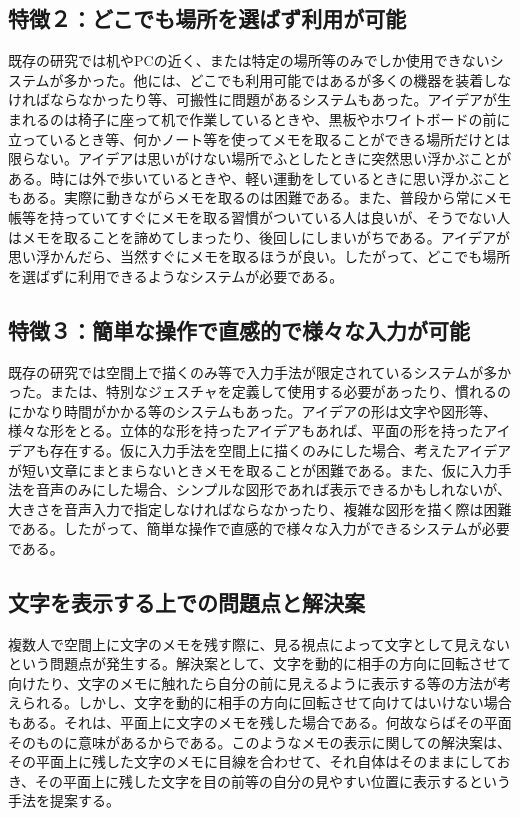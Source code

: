 \documentclass[technicalreport]{ieicej}
\begin{document}
\subsection*{特徴２：どこでも場所を選ばず利用が可能}
既存の研究では机やPCの近く、または特定の場所等のみでしか使用できないシステムが多かった。他には、どこでも利用可能ではあるが多くの機器を装着しなければならなかったり等、可搬性に問題があるシステムもあった。アイデアが生まれるのは椅子に座って机で作業しているときや、黒板やホワイトボードの前に立っているとき等、何かノート等を使ってメモを取ることができる場所だけとは限らない。アイデアは思いがけない場所でふとしたときに突然思い浮かぶことがある。時には外で歩いているときや、軽い運動をしているときに思い浮かぶこともある。実際に動きながらメモを取るのは困難である。また、普段から常にメモ帳等を持っていてすぐにメモを取る習慣がついている人は良いが、そうでない人はメモを取ることを諦めてしまったり、後回しにしまいがちである。アイデアが思い浮かんだら、当然すぐにメモを取るほうが良い。したがって、どこでも場所を選ばずに利用できるようなシステムが必要である。

\subsection*{特徴３：簡単な操作で直感的で様々な入力が可能}
既存の研究では空間上で描くのみ等で入力手法が限定されているシステムが多かった。または、特別なジェスチャを定義して使用する必要があったり、慣れるのにかなり時間がかかる等のシステムもあった。アイデアの形は文字や図形等、様々な形をとる。立体的な形を持ったアイデアもあれば、平面の形を持ったアイデアも存在する。仮に入力手法を空間上に描くのみにした場合、考えたアイデアが短い文章にまとまらないときメモを取ることが困難である。また、仮に入力手法を音声のみにした場合、シンプルな図形であれば表示できるかもしれないが、大きさを音声入力で指定しなければならなかったり、複雑な図形を描く際は困難である。したがって、簡単な操作で直感的で様々な入力ができるシステムが必要である。

\subsection{文字を表示する上での問題点と解決案} \label{moji_mondai}
複数人で空間上に文字のメモを残す際に、見る視点によって文字として見えないという問題点が発生する。解決案として、文字を動的に相手の方向に回転させて向けたり、文字のメモに触れたら自分の前に見えるように表示する等の方法が考えられる。しかし、文字を動的に相手の方向に回転させて向けてはいけない場合もある。それは、平面上に文字のメモを残した場合である。何故ならばその平面そのものに意味があるからである。このようなメモの表示に関しての解決案は、その平面上に残した文字のメモに目線を合わせて、それ自体はそのままにしておき、その平面上に残した文字を目の前等の自分の見やすい位置に表示するという手法を提案する。
\end{document}
